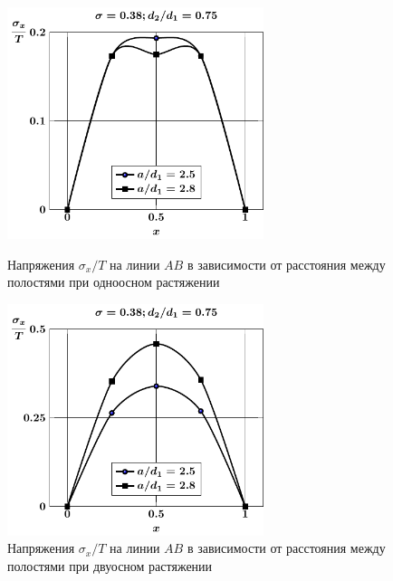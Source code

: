 \begin{figure}[h!]
\centering\footnotesize
\parbox[b]{7.5cm}{\centering\includegraphics[width=7.5cm]{periodic-cav27-a-d75-t1-sig_x.pdf}
\caption{Напряжения $\sigma_x/T$ на линии $AB$ в зависимости от расстояния между полостями при одноосном растяжении
\label{f:11:20}}}\hfil\hfil
\parbox[b]{7.5cm}{\centering\includegraphics[width=7.5cm]{periodic-cav27-a-d75-t2-sig_x.pdf}
\caption{Напряжения $\sigma_x/T$ на линии $AB$ в зависимости от расстояния между полостями при двуосном растяжении
\label{f:11:21}}}
\end{figure}

